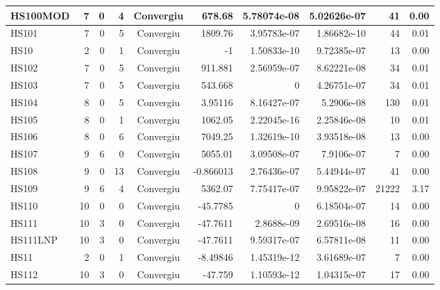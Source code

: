 \begin{center}
\begin{longtable}{|l|r|r|r|c|r|r|r|r|r|}
HS100MOD &      7 &      0 &      4 & Convergiu  &      678.68 &    5.78074e-08 & 5.02626e-07 &     41 &    0.00 \\ \hline
   HS101 &      7 &      0 &      5 & Convergiu  &     1809.76 &    3.95783e-07 & 1.86682e-10 &     44 &    0.01 \\ \hline
    HS10 &      2 &      0 &      1 & Convergiu  &          -1 &    1.50833e-10 & 9.72385e-07 &     13 &    0.00 \\ \hline
   HS102 &      7 &      0 &      5 & Convergiu  &     911.881 &    2.56959e-07 & 8.62221e-08 &     34 &    0.01 \\ \hline
   HS103 &      7 &      0 &      5 & Convergiu  &     543.668 &              0 & 4.26751e-07 &     34 &    0.01 \\ \hline
   HS104 &      8 &      0 &      5 & Convergiu  &     3.95116 &    8.16427e-07 &  5.2906e-08 &    130 &    0.01 \\ \hline
   HS105 &      8 &      0 &      1 & Convergiu  &     1062.05 &    2.22045e-16 & 2.25846e-08 &     10 &    0.01 \\ \hline
   HS106 &      8 &      0 &      6 & Convergiu  &     7049.25 &    1.32619e-10 & 3.93518e-08 &     13 &    0.00 \\ \hline
   HS107 &      9 &      6 &      0 & Convergiu  &     5055.01 &    3.09508e-07 &  7.9106e-07 &      7 &    0.00 \\ \hline
   HS108 &      9 &      0 &     13 & Convergiu  &   -0.866013 &    2.76436e-07 & 5.44944e-07 &     41 &    0.00 \\ \hline
   HS109 &      9 &      6 &      4 & Convergiu  &     5362.07 &    7.75417e-07 & 9.95822e-07 &  21222 &    3.17 \\ \hline
   HS110 &     10 &      0 &      0 & Convergiu  &    -45.7785 &              0 & 6.18504e-07 &     14 &    0.00 \\ \hline
   HS111 &     10 &      3 &      0 & Convergiu  &    -47.7611 &     2.8688e-09 & 2.69516e-08 &     16 &    0.00 \\ \hline
HS111LNP &     10 &      3 &      0 & Convergiu  &    -47.7611 &    9.59317e-07 & 6.57811e-08 &     11 &    0.00 \\ \hline
    HS11 &      2 &      0 &      1 & Convergiu  &    -8.49846 &    1.45319e-12 & 3.61689e-07 &      7 &    0.00 \\ \hline
   HS112 &     10 &      3 &      0 & Convergiu  &     -47.759 &    1.10593e-12 & 1.04315e-07 &     17 &    0.00 \\ \hline

\end{longtable}
\end{center}
